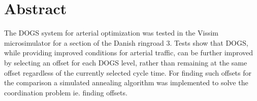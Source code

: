 \section*{Abstract}
The DOGS system for arterial optimization was tested in the Vissim microsimulator for a section of the Danish ringroad 3. Tests show that DOGS, while providing improved conditions for arterial traffic, can be further improved by selecting an offset for each DOGS level, rather than remaining at the same offset regardless of the currently selected cycle time. For finding such offsets for the comparison a simulated annealing algorithm was implemented to solve the coordination problem ie. finding offsets.